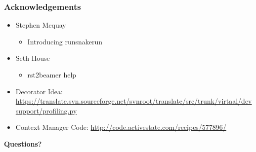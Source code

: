 \documentclass[t]{beamer}
\begin{document}
\begin{frame}[fragile]
\frametitle{Acknowledgements}

\begin{itemize}

\item Stephen Mcquay
\begin{itemize}

\item Introducing runsnakerun
\end{itemize}

\item Seth House
\begin{itemize}

\item rst2beamer help
\end{itemize}

\item Decorator Idea:
\url{https://translate.svn.sourceforge.net/svnroot/translate/src/trunk/virtaal/devsupport/profiling.py}

\item Context Manager Code:
\url{http://code.activestate.com/recipes/577896/}
\end{itemize}

\textbf{Questions?}
\end{frame}
\end{document}

